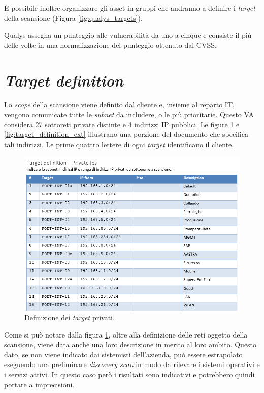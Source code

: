 \documentclass[target=bach,aauheader=]{thud}
\begin{document}
È possibile inoltre organizzare gli asset in gruppi che andranno a definire i \textit{target} della scansione (Figura \ref{fig:qualys_targets}).

Qualys assegna un punteggio alle vulnerabilità da uno a cinque e consiste il più delle volte in una normalizzazione del punteggio ottenuto dal CVSS.

\section{\textit{Target definition}}
Lo \textit{scope} della scansione viene definito dal cliente e, insieme al reparto IT, vengono comunicate tutte le \textit{subnet} da includere, o le più prioritarie. Questo VA considera 27 sottoreti private distinte e 4 indirizzi IP pubblici. Le figure \ref{fig:target_definition_int} e \ref{fig:target_definition_ext} illustrano una porzione del documento che specifica tali indirizzi. Le prime quattro lettere di ogni \textit{target} identificano il cliente.

\begin{figure}[h]
\centering
\includegraphics[scale=0.8]{images/target_definition_int.png}
    \caption{Definizione dei \textit{target} privati.}
    \label{fig:target_definition_int}
\end{figure}

Come si può notare dalla figura \ref{fig:target_definition_int}, oltre alla definizione delle reti oggetto della scansione, viene data anche una loro descrizione in merito al loro ambito. Questo dato, se non viene indicato dai sistemisti dell'azienda, può essere estrapolato eseguendo una preliminare \textit{discovery scan} in modo da rilevare i sistemi operativi e i servizi attivi. In questo caso però i risultati sono indicativi e potrebbero quindi portare a imprecisioni.
\end{document}
